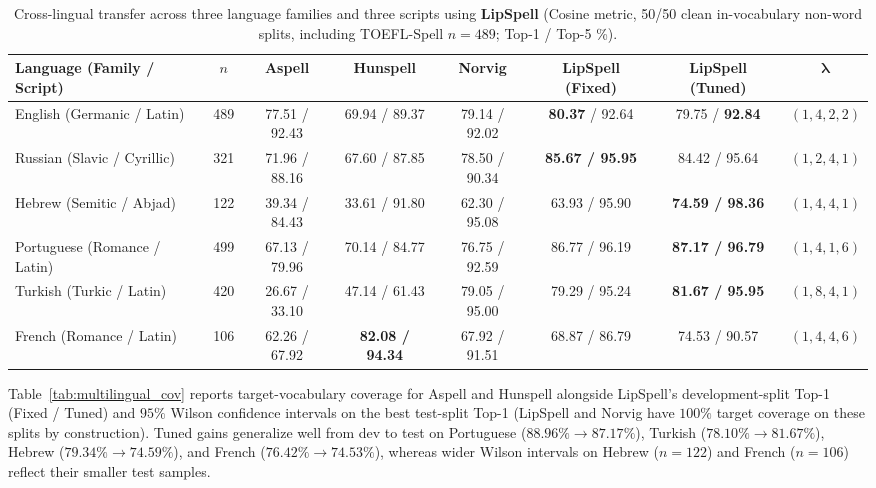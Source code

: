 \documentclass[11pt,a4paper]{article}
\begin{document}
\begin{table}[ht]
\centering
\scriptsize
\setlength{\tabcolsep}{2.2pt}
\caption{Cross-lingual transfer across three language families and three scripts using \textbf{LipSpell} (Cosine metric, 50/50 clean in-vocabulary non-word splits, including TOEFL-Spell $n=489$; Top-1 / Top-5 \%).}
\label{tab:multilingual}
\begin{tabular}{lccccccc}
\toprule
Language (Family / Script) & $n$ & Aspell & Hunspell & Norvig & LipSpell (Fixed) & LipSpell (Tuned) & $\boldsymbol{\lambda}$ \\
\midrule
English (Germanic / Latin)   & 489 & 77.51 / 92.43 & 69.94 / 89.37 & 79.14 / 92.02 & \textbf{80.37} / 92.64 & 79.75 / \textbf{92.84} & $(1,4,2,2)$ \\
Russian (Slavic / Cyrillic)  & 321 & 71.96 / 88.16 & 67.60 / 87.85 & 78.50 / 90.34 & \textbf{85.67 / 95.95} & 84.42 / 95.64 & $(1,2,4,1)$ \\
Hebrew (Semitic / Abjad)     & 122 & 39.34 / 84.43 & 33.61 / 91.80 & 62.30 / 95.08 & 63.93 / 95.90 & \textbf{74.59 / 98.36} & $(1,4,4,1)$ \\
Portuguese (Romance / Latin) & 499 & 67.13 / 79.96 & 70.14 / 84.77 & 76.75 / 92.59 & 86.77 / 96.19 & \textbf{87.17 / 96.79} & $(1,4,1,6)$ \\
Turkish (Turkic / Latin)     & 420 & 26.67 / 33.10 & 47.14 / 61.43 & 79.05 / 95.00 & 79.29 / 95.24 & \textbf{81.67 / 95.95} & $(1,8,4,1)$ \\
French (Romance / Latin)     & 106 & 62.26 / 67.92 & \textbf{82.08 / 94.34} & 67.92 / 91.51 & 68.87 / 86.79 & 74.53 / 90.57 & $(1,4,4,6)$ \\
\bottomrule
\end{tabular}
\end{table}

Table~\ref{tab:multilingual_cov} reports target-vocabulary coverage for Aspell and Hunspell alongside LipSpell's development-split Top-1 (Fixed / Tuned) and $95\%$ Wilson confidence intervals on the best test-split Top-1 (LipSpell and Norvig have $100\%$ target coverage on these splits by construction). Tuned gains generalize well from dev to test on Portuguese ($88.96\% \rightarrow 87.17\%$), Turkish ($78.10\% \rightarrow 81.67\%$), Hebrew ($79.34\% \rightarrow 74.59\%$), and French ($76.42\% \rightarrow 74.53\%$), whereas wider Wilson intervals on Hebrew ($n=122$) and French ($n=106$) reflect their smaller test samples.
\end{document}

